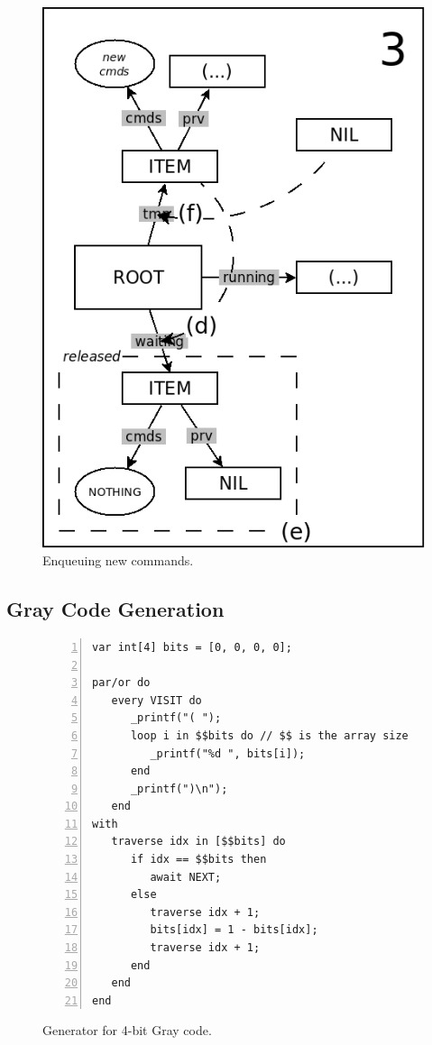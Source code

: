\documentclass{acm_proc_article-sp}
\begin{document}
\begin{figure}
\begin{minipage}[t]{0.24\linewidth}
\includegraphics[scale=0.25]{queue-23.png}
\end{minipage}
\caption{
Enqueuing new commands.
\label{fig.queue-2}
}
\end{figure}

\subsection{Gray Code Generation}

\begin{figure}%
\begin{lstlisting}[numbers=left,xleftmargin=3em]
var int[4] bits = [0, 0, 0, 0];

par/or do
   every VISIT do
      _printf("( ");
      loop i in $$bits do // $$ is the array size
         _printf("%d ", bits[i]);
      end
      _printf(")\n");
   end
with
   traverse idx in [$$bits] do
      if idx == $$bits then
         await NEXT;
      else
         traverse idx + 1;
         bits[idx] = 1 - bits[idx];
         traverse idx + 1;
      end
   end
end
\end{lstlisting}
\caption{ Generator for 4-bit Gray code.
\label{lst.gray}
}
\end{figure}
\end{document}
